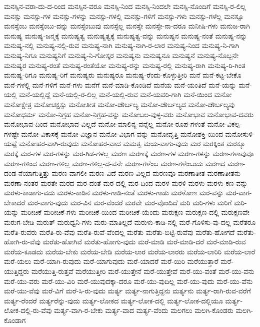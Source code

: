 {ಮನಸ್ಸಿನ-ವರಾ-ದು-ದ-ರಿಂದ
ಮನಸ್ಸಿನ-ವರೂ
ಮನಸ್ಸಿ-ನಿಂದ
ಮನಸ್ಸಿ-ನಿಂದಲೇ
ಮನಸ್ಸಿ-ನೊಂದಿಗೆ
ಮನಸ್ಸಿ-ರ-ಲಿಲ್ಲ
ಮನಸ್ಸು
ಮನಸ್ಸು-ಗಳ
ಮನಸ್ಸು-ಗಳನ್ನು
ಮನಸ್ಸು-ಗಳಲ್ಲಿ
ಮನಸ್ಸು-ಗಳಿಗೆ
ಮನಸ್ಸು-ಗಳು
ಮನಸ್ಸು-ಗಳೆಲ್ಲ
ಮನಸ್ಸೂ
ಮನಸ್ಸೆಂಬ
ಮನಸ್ಸೆಂಬು-ದನ್ನು
ಮನಸ್ಸೆಂಬುವು
ಮನಸ್ಸೆಲ್ಲ
ಮನಸ್ಸೇ
ಮನಸ್ಸೇ-ನಾ-ದರೂ
ಮನೀಷಿ-ಗಳು
ಮನುಜ-ರಾಗಿ
ಮನುಷ್ಯ
ಮನುಷ್ಯ-ಜನ್ಮಕ್ಕೆ
ಮನುಷ್ಯತ್ವ
ಮನುಷ್ಯತ್ವಕ್ಕೆ
ಮನುಷ್ಯತ್ವ-ವನ್ನು
ಮನುಷ್ಯನ
ಮನುಷ್ಯ-ನಂತೆ
ಮನುಷ್ಯ-ನನ್ನು
ಮನುಷ್ಯ-ನಲ್ಲಿ
ಮನುಷ್ಯ-ನಲ್ಲಿ-ರುವ
ಮನುಷ್ಯ-ನಾಗಿ
ಮನುಷ್ಯ-ನಾಗಿ-ರ-ಲಾರ
ಮನುಷ್ಯ-ನಿಂದ
ಮನುಷ್ಯ-ನಿ-ಗಾಗಿ
ಮನುಷ್ಯ-ನಿಗೂ
ಮನುಷ್ಯನಿಗೆ
ಮನುಷ್ಯ-ನಿ-ಗೋಸ್ಕರ
ಮನುಷ್ಯನು
ಮನುಷ್ಯನೂ
ಮನುಷ್ಯನೆ
ಮನುಷ್ಯ-ನೊಬ್ಬನೇ
ಮನುಷ್ಯರ
ಮನುಷ್ಯ-ರಂತೆ
ಮನುಷ್ಯ-ರಂತೆಯೋ
ಮನುಷ್ಯ-ರನ್ನು
ಮನುಷ್ಯ-ರಲ್ಲಿ
ಮನುಷ್ಯ-ರಾಗಿ
ಮನುಷ್ಯ-ರಿ-ಗಿಂತ
ಮನುಷ್ಯ-ರಿಗೂ
ಮನುಷ್ಯ-ರಿಗೆ
ಮನುಷ್ಯರು
ಮನುಷ್ಯರೂ
ಮನುಷ್ಯ-ರೆಂದು-ಕೊಳ್ಳುತ್ತೀರಿ
ಮನೆ
ಮನೆ-ಕಟ್ಟ-ಬೇಕೊ
ಮನೆ-ಗಳಲ್ಲಿ
ಮನೆ-ಗಳಿಗೆ
ಮನೆ-ಗಳು
ಮನೆಗೆ
ಮನೆ-ಮಾಡಿ-ಕೊಂಡಿದೆ
ಮನೆಯ
ಮನೆ-ಯಂತಿದೆ
ಮನೆ-ಯನ್ನು
ಮನೆ-ಯಲ್ಲಿ
ಮನೆ-ಯಲ್ಲಿದ್ದೆ
ಮನೆ-ಯಲ್ಲಿ-ರ-ಲಿಲ್ಲ
ಮನೆ-ಯಲ್ಲಿ-ರುವ
ಮನೆ-ಯವರಿ-ಗಾಗಿ
ಮನೆ-ಯಿಂದ
ಮನೋ
ಮನೋಕ್ಷೇತ್ರ
ಮನೋಚಕ್ಷಸ್ಸು
ಮನೋತೀತ
ಮನೋ-ದೌರ್ಬಲ್ಯ
ಮನೋ-ದೌರ್ಬಲ್ಯದ
ಮನೋ-ದೌರ್ಬಲ್ಯವು
ಮನೋಧರ್ಮ
ಮನೋ-ನಿಗ್ರಹ
ಮನೋ-ನಿಗ್ರಹ-ವನ್ನು
ಮನೋಬಲ-ವುಳ್ಳ-ವರು
ಮನೋಭಾವ
ಮನೋಭಾವ-ದವರು
ಮನೋಭಾವ-ದಿಂದ
ಮನೋಭಾವ-ವಿಲ್ಲದೆ
ಮನೋ-ಮಾಲಿನ್ಯ-ವನ್ನೆಲ್ಲ
ಮನೋ-ರೂಪ-ಗಳಂತೆ
ಮನೋ-ವಿಕಲ್ಪ-ಗಳಷ್ಟೇ
ಮನೋ-ವಿಕಾಸಕ್ಕೆ
ಮನೋ-ವಿಜ್ಞಾನ
ಮನೋ-ವಿಭಾಗ-ವನ್ನು
ಮನೋವೃತ್ತಿ
ಮನೋಶಕ್ತಿ-ಯಿಂದ
ಮನೋಸುಳಿ-ಯಷ್ಟೆ
ಮನೋಹರ-ವಾಗಿ-ರುವುದು
ಮನೋಹರ-ವಾದ
ಮಮತ್ವ
ಮಯ-ವಾಗು-ವುದು
ಮರ
ಮರಕ್ಕಿಂತ
ಮರಕ್ಕೂ
ಮರಕ್ಕೆ
ಮರ-ಗಳ
ಮರ-ಗಳನ್ನು
ಮರ-ಗಿಡ-ಗಳಲ್ಲ
ಮರಣ
ಮರಣಕ್ಕೆ
ಮರಣ-ಗಳ
ಮರಣ-ಗಳನ್ನು
ಮರಣ-ಗಳಾವುವೂ
ಮರಣ-ಗಳಿಂದ
ಮರಣ-ಗಳಿಲ್ಲ
ಮರಣ-ಗಳಿಲ್ಲ-ದ-ವನೇ
ಮರಣ-ಗಳೆಂಬ
ಮರಣ-ಗಳೆಂಬುದು
ಮರಣದ
ಮರಣ-ದಂಡ-ನೆಯಾಗುತ್ತಿತ್ತು
ಮರಣ-ವಾಗಲೀ
ಮರಣ-ವಿದೆ
ಮರಣ-ವಿಲ್ಲದ
ಮರಣವೂ
ಮರಣಾತೀತ
ಮರಣಾತೀತನು
ಮರಣಾ-ನಂತರ
ಮರತೇ
ಮರದ
ಮರ-ದಂತೆ
ಮರ-ದಲ್ಲಿ
ಮರ-ದಿಂದ
ಮರಳ
ಮರಳಿ
ಮರಳು
ಮರಳು-ಕಣ-ವನ್ನು
ಮರಳು-ಕಾಡಾಗು-ವದು
ಮರಳು-ಕಾಡಿನ
ಮರಳು-ಗಾಡಿ-ನಂತೆ
ಮರಳು-ಗಾಡು
ಮರಳೋಣ
ಮರ-ವನ್ನು
ಮರ-ವಾಗ-ಬೇಕಾದರೆ
ಮರ-ವಾಗು-ವುದು
ಮರ-ವಿನ
ಮರ-ವೆಂದರೆ
ಮರವೇ
ಮರ-ವೊಂದಿದೆ
ಮರಿ
ಮರಿ-ಗಳು
ಮರಿಗೆ
ಮರಿ-ಯನ್ನು
ಮರೀಚಿಕೆ
ಮರೀಚಿಕೆ-ಗಳು
ಮರೀಚಿಕೆ-ಯಿಂದ
ಮರೀಚಿಕೆ-ಯೆಂದು
ಮರುಕ್ಷಣ
ಮರುಕ್ಷಣ-ದಲ್ಲಿ
ಮರುಕ್ಷಣವೇ
ಮರುಗ-ಬೇಡಿ
ಮರುತ್
ಮರುಧ್ವನಿ-ಗಳು
ಮರು-ಮಾತಿಲ್ಲದೆ
ಮರುಳು-ಕಾಡಿ-ನಲ್ಲಿ
ಮರೆ-ಗೊಳಿಸು-ವು-ದಲ್ಲ
ಮರೆತರೂ
ಮರೆತಿ-ರುವರು
ಮರೆತಿ-ರು-ವೆವು
ಮರೆತಿ-ರುವೆ-ವೆಂದಲ್ಲ
ಮರೆತು
ಮರೆತು-ಬಿಟ್ಟಿ-ರುವೆವು
ಮರೆತು-ಹೋಗದೆ
ಮರೆತು-ಹೋಗಿ-ರು-ವೆವು
ಮರೆತು-ಹೋಗಿವೆ
ಮರೆತು-ಹೋಗು-ವುದು
ಮರೆ-ಮಾಡಿ
ಮರೆ-ಮಾಡಿ-ದರೆ
ಮರೆ-ಮಾಡಿ-ರುವ
ಮರೆಯ-ಕೂಡದು
ಮರೆಯ-ಬೇಕು
ಮರೆಯ-ಬೇಡಿ
ಮರೆಯ-ಲಾರ
ಮರೆಯ-ಲಾರರು
ಮರೆಯ-ಲಾರಿರಿ
ಮರೆಯ-ಲಾರೆ
ಮರೆ-ಯಲು
ಮರೆ-ಯಾಗಿ-ರುವುದು
ಮರೆ-ಯಾಗುವುದು
ಮರೆ-ಯಾದರೆ
ಮರೆ-ಯಿರಿ
ಮರೆಯುತ್ತಾರೆ
ಮರೆ-ಯುತ್ತಿದ್ದರು
ಮರೆಯುತ್ತಿ-ರುತ್ತವೆ
ಮರೆಯುತ್ತೀರಿ
ಮರೆ-ಯುತ್ತೇನೆ
ಮರೆ-ಯುತ್ತೇವೆ
ಮರೆ-ಯು-ವಂತೆ
ಮರೆ-ಯು-ವನು
ಮರೆ-ಯು-ವರು
ಮರೆ-ಯು-ವಿರಿ
ಮರೆ-ಯುವುದಕ್ಕಾ-ದರೂ
ಮರೆ-ಯು-ವುದಿಲ್ಲ
ಮರೆ-ಯು-ವುದು
ಮರೆ-ಯು-ವೆನು
ಮರೆ-ಯು-ವೆವು
ಮರೆ-ವಿಗೆ
ಮರೆ-ಸಿ-ರು-ವುದು
ಮರ್ತ್ಯ
ಮರ್ತ್ಯ-ನಾಗುತ್ತಿದ್ದನು
ಮರ್ತ್ಯನು
ಮರ್ತ್ಯ-ರಾಗಿ-ರುವ-ವರೆಗೆ
ಮರ್ತ್ಯ-ರೆಂದರೆ
ಮರ್ತ್ಯರೆನ್ನು-ವುದು
ಮರ್ತ್ಯ-ಲೋಕದ
ಮರ್ತ್ಯ-ಲೋಕ-ದಲ್ಲಿ
ಮರ್ತ್ಯ-ಲೋಕ-ದಲ್ಲಿಯೂ
ಮರ್ತ್ಯ-ಲೋಕ-ದಲ್ಲಿ-ರು-ವೆವು
ಮರ್ತ್ಯ-ವಾಗಿ-ರ-ಬೇಕು
ಮರ್ತ್ಯ-ವಾದ
ಮರ್ತ್ಯ-ವೆಂದು
ಮಲಗಲು
ಮಲಗಿ-ಕೊಂಡರು
ಮಲಗಿ-ಕೊಂಡಾಗ
}
